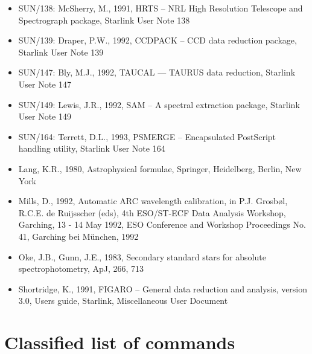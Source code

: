 \begin{itemize}
\item SUN/138: McSherry, M., 1991, HRTS -- NRL High Resolution Telescope
   and Spectrograph package, Starlink User Note 138

\item SUN/139: Draper, P.W., 1992, CCDPACK -- CCD data reduction package,
   Starlink User Note 139

\item SUN/147: Bly, M.J., 1992, TAUCAL --- TAURUS data reduction,
   Starlink User Note 147

\item SUN/149: Lewis, J.R., 1992, SAM -- A spectral extraction package,
   Starlink User Note 149

\item SUN/164: Terrett, D.L., 1993, PSMERGE -- Encapsulated PostScript
   handling utility, Starlink User Note 164

\item Lang, K.R., 1980, Astrophysical formulae, Springer, Heidelberg,
   Berlin, New York

\item Mills, D., 1992, Automatic ARC wavelength calibration, in P.J.
   Grosb\o l, R.C.E. de Ruijsscher (eds), 4th ESO/ST-ECF Data Analysis
   Workshop, Garching, 13 - 14 May 1992, ESO Conference and Workshop
   Proceedings No. 41, Garching bei M\"unchen, 1992

\item Oke, J.B., Gunn, J.E., 1983, Secondary standard stars for absolute
   spectrophotometry, ApJ, 266, 713

\item Shortridge, K., 1991, FIGARO -- General data reduction and
   analysis, version 3.0, Users guide, Starlink, Miscellaneous User
   Document

\end{itemize}



\appendix

\newpage
\section{Classified list of commands}
\label{classif}

